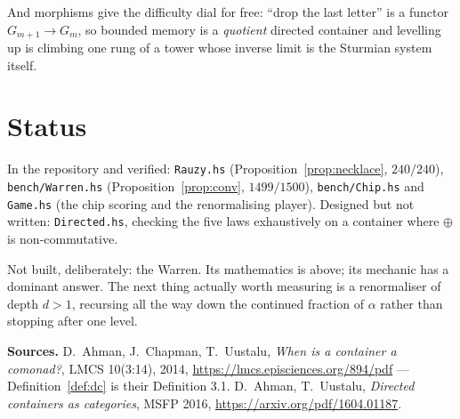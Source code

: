 \documentclass[11pt,a4paper]{article}
\theoremstyle{definition}
\theoremstyle{plain}
\theoremstyle{remark}
\begin{document}
\noindent
And morphisms give the difficulty dial for free: ``drop the last letter'' is a
functor $G_{m+1} \to G_m$, so bounded memory is a \emph{quotient} directed
container and levelling up is climbing one rung of a tower whose inverse limit
is the Sturmian system itself.

\section{Status}

In the repository and verified: \texttt{Rauzy.hs}
(Proposition~\ref{prop:necklace}, $240/240$), \texttt{bench/Warren.hs}
(Proposition~\ref{prop:conv}, $1499/1500$), \texttt{bench/Chip.hs} and
\texttt{Game.hs} (the chip scoring and the renormalising player). Designed but
not written: \texttt{Directed.hs}, checking the five laws exhaustively on a
container where $\oplus$ is non-commutative.

Not built, deliberately: the Warren. Its mathematics is above; its mechanic has
a dominant answer. The next thing actually worth measuring is a renormaliser of
depth $d > 1$, recursing all the way down the continued fraction of $\alpha$
rather than stopping after one level.

\vspace{1em}\noindent\textbf{Sources.}
D.~Ahman, J.~Chapman, T.~Uustalu, \emph{When is a container a comonad?}, LMCS
10(3:14), 2014, \url{https://lmcs.episciences.org/894/pdf} ---
Definition~\ref{def:dc} is their Definition 3.1.
D.~Ahman, T.~Uustalu, \emph{Directed containers as categories}, MSFP 2016,
\url{https://arxiv.org/pdf/1604.01187}.
\end{document}
